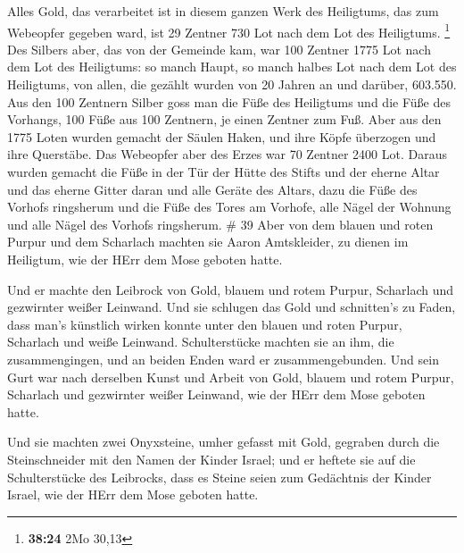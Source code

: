  Alles Gold, das verarbeitet ist in diesem ganzen Werk des
Heiligtums, das zum Webeopfer gegeben ward, ist 29 Zentner 730 Lot nach
dem Lot des Heiligtums. \footnote{\textbf{38:24} 2Mo 30,13}
 Des Silbers aber, das von der Gemeinde kam, war 100
Zentner 1775 Lot nach dem Lot des Heiligtums:  so manch
Haupt, so manch halbes Lot nach dem Lot des Heiligtums, von allen, die
gezählt wurden von 20 Jahren an und darüber, 603.550.  Aus
den 100 Zentnern Silber goss man die Füße des Heiligtums und die Füße
des Vorhangs, 100 Füße aus 100 Zentnern, je einen Zentner zum Fuß.
 Aber aus den 1775 Loten wurden gemacht der Säulen Haken,
und ihre Köpfe überzogen und ihre Querstäbe.  Das Webeopfer
aber des Erzes war 70 Zentner 2400 Lot.  Daraus wurden
gemacht die Füße in der Tür der Hütte des Stifts und der eherne Altar
und das eherne Gitter daran und alle Geräte des Altars, 
dazu die Füße des Vorhofs ringsherum und die Füße des Tores am Vorhofe,
alle Nägel der Wohnung und alle Nägel des Vorhofs ringsherum. \# 39
 Aber von dem blauen und roten Purpur und dem Scharlach
machten sie Aaron Amtskleider, zu dienen im Heiligtum, wie der HErr dem
Mose geboten hatte.

 Und er machte den Leibrock von Gold, blauem und rotem
Purpur, Scharlach und gezwirnter weißer Leinwand.  Und sie
schlugen das Gold und schnitten's zu Faden, dass man's künstlich wirken
konnte unter den blauen und roten Purpur, Scharlach und weiße Leinwand.
 Schulterstücke machten sie an ihm, die zusammengingen, und
an beiden Enden ward er zusammengebunden.  Und sein Gurt war
nach derselben Kunst und Arbeit von Gold, blauem und rotem Purpur,
Scharlach und gezwirnter weißer Leinwand, wie der HErr dem Mose geboten
hatte.

 Und sie machten zwei Onyxsteine, umher gefasst mit Gold,
gegraben durch die Steinschneider mit den Namen der Kinder Israel;
 und er heftete sie auf die Schulterstücke des Leibrocks,
dass es Steine seien zum Gedächtnis der Kinder Israel, wie der HErr dem
Mose geboten hatte.

